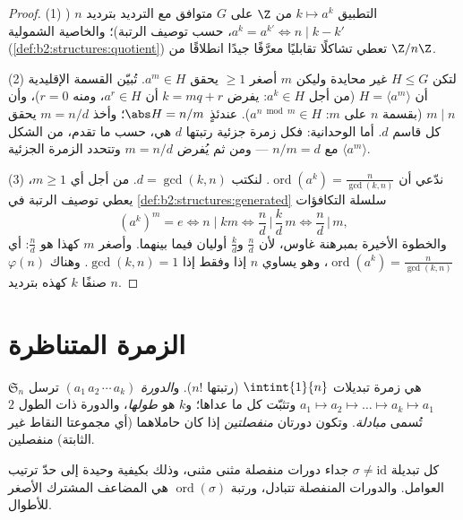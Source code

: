 \begin{proof}
(1) التطبيق $k \mapsto a^k$ من $\Z$ على $G$ متوافق مع
الترديد بترديد $n$ ($a^{k} = a^{k'} \iff n \mid k - k'$، حسب توصيف
الرتبة)؛ والخاصية الشمولية
(\cref{def:b2:structures:quotient}) تعطي تشاكلًا تقابليًا
معرَّفًا جيدًا انطلاقًا من $\Z/n\Z$.

(2) لتكن $H \leq G$ غير محايدة وليكن $m$ أصغر $\geq 1$ يحقق $a^m \in
H$. تُبيّن القسمة الإقليدية أن $H = \langle a^m\rangle$ (من أجل $a^k \in
H$: يفرض $k = mq + r$ أن $a^r \in H$، ومنه $r = 0$)، وأن $m \mid n$
(بقسمة $n$ على $m$: $a^{n \bmod m} \in H$). عندئذٍ $\abs H = n/m$؛
وأخذ $m = n/d$ يحقق كل قاسم $d$. أما الوحدانية: فكل زمرة جزئية
رتبتها $d$ هي، حسب ما تقدم، من الشكل $\langle a^m \rangle$
مع $n/m = d$ --- ومن ثم يُفرض $m = n/d$ وتتحدد الزمرة الجزئية.

(3) ندّعي أن $\operatorname{ord}(a^k) = \frac{n}{\gcd(k, n)}$.
لنكتب $d = \gcd(k, n)$. من أجل أي $m \geq 1$، يعطي توصيف
الرتبة في \cref{def:b2:structures:generated} سلسلة التكافؤات
\[
(a^k)^m = e
\iff n \mid km
\iff \frac{n}{d} \,\Big|\, \frac{k}{d}\,m
\iff \frac{n}{d} \,\Big|\, m ,
\]
والخطوة الأخيرة بمبرهنة غاوس، لأن $\frac nd$ و$\frac kd$
أوليان فيما بينهما. وأصغر $m$ كهذا هو $\frac nd$:
أي $\operatorname{ord}(a^k) = \frac n{\gcd(k,n)}$، وهو يساوي $n$
إذا وفقط إذا $\gcd(k, n) = 1$. وهناك $\varphi(n)$ صنفًا $k$ كهذه
بترديد $n$.
\end{proof}

\section{الزمرة المتناظرة}

\begin{definition}\label{def:b2:structures:sn}
$\mathfrak{S}_n$ هي زمرة تبديلات $\intint{1}{n}$
(رتبتها $n!$). و\emph{الدورة} $(a_1\,a_2\,\cdots\,a_k)$
ترسل $a_1 \mapsto a_2 \mapsto \dots \mapsto a_k \mapsto a_1$
وتثبّت كل ما عداها؛ و$k$ هو \emph{طولها}، والدورة ذات الطول $2$ تُسمى
\emph{مبادلة}. وتكون دورتان
\emph{منفصلتين} إذا كان حاملاهما (أي مجموعتا النقاط غير الثابتة)
منفصلين.
\end{definition}

\begin{theorem}\label{thm:b2:structures:cycles}
كل تبديلة $\sigma \neq \mathrm{id}$ جداء دورات منفصلة مثنى مثنى، وذلك بكيفية
وحيدة إلى حدّ ترتيب العوامل. والدورات المنفصلة تتبادل، ورتبة
$\operatorname{ord}(\sigma)$ هي المضاعف المشترك الأصغر للأطوال.
\end{theorem}

